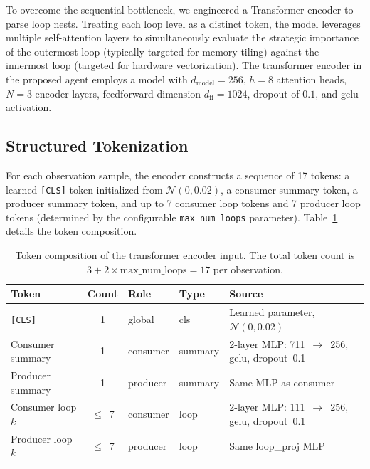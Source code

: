 To overcome the sequential bottleneck, we engineered a Transformer encoder to parse loop nests. Treating each loop level as a distinct token, the model leverages multiple self-attention layers to simultaneously evaluate the strategic importance of the outermost loop (typically targeted for memory tiling) against the innermost loop (targeted for hardware vectorization). The transformer encoder in the proposed agent employs a model with $d_\text{model} = 256$, $h = 8$ attention heads, $N = 3$ encoder layers, feedforward dimension $d_\text{ff} = 1024$, dropout of $0.1$, and \gls{gelu} activation.

\subsection{Structured Tokenization}
For each observation sample, the encoder constructs a sequence of 17 tokens: a learned \texttt{[CLS]} token initialized from $\mathcal{N}(0, 0.02)$, a consumer summary token, a producer summary token, and up to 7 consumer loop tokens and 7 producer loop tokens (determined by the configurable \texttt{max\_num\_loops} parameter). Table~\ref{tab:transformer-tokens} details the token composition.

\begin{table}[H]
    \centering

    \caption[Token composition of the transformer encoder input.]{Token composition of the transformer encoder input. The total token count is $3 + 2 \times \text{max\_num\_loops} = 17$ per observation.}

    \label{tab:transformer-tokens}
    \vspace{0.2cm}
    \begin{tabularx}{\textwidth}{l c l l X}
        \toprule
        \textbf{Token} & \textbf{Count} & \textbf{Role} & \textbf{Type} & \textbf{Source} \\
        \midrule
        \texttt{[CLS]} & 1 & global & cls & Learned parameter, $\mathcal{N}(0,0.02)$ \\
        Consumer summary & 1 & consumer & summary & 2-layer MLP: 711~$\to$~256, \gls{gelu}, dropout~0.1 \\
        Producer summary & 1 & producer & summary & Same MLP as consumer \\
        Consumer loop $k$ & $\leq$~7 & consumer & loop & 2-layer MLP: 111~$\to$~256, \gls{gelu}, dropout~0.1 \\
        Producer loop $k$ & $\leq$~7 & producer & loop & Same loop\_proj MLP \\
        \bottomrule
    \end{tabularx}
\end{table}

